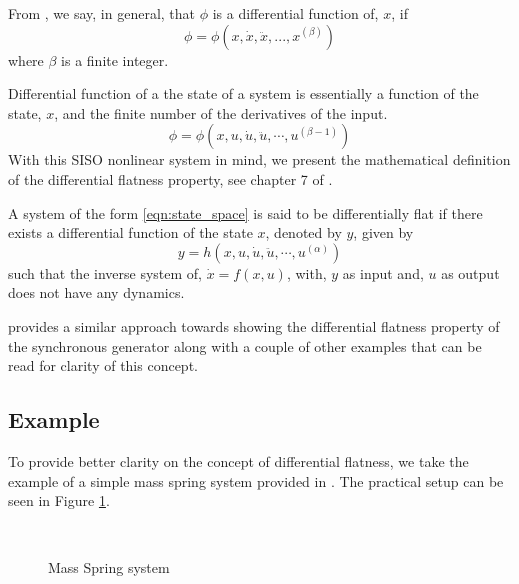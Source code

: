 \documentclass[letterpaper%
, twoside%
, 12pt%
,memoire%
, english%
,creativecommons,hyperref%
]{thETS}
\begin{document}
\begin{definition}
	From \citep{teschl2012ordinary}, we say, in general, that $\phi$ is a differential function of, $x$, if\\
	\begin{equation*}
		\phi=\phi(x,\dot{x},\ddot{x},...,x^{(\beta)})
	\end{equation*}
	where $\beta$ is a finite integer.
\end{definition}
Differential function of a the state of a system is essentially a function of the state, $x$, and the finite number of the derivatives of the input. 
\begin{equation*}
	\phi=\phi(x,u,\dot{u},\ddot{u},\cdots,u^{(\beta-1)})
\end{equation*}
With this SISO nonlinear system in mind, we present the mathematical definition of the differential flatness property, see chapter 7 of \citep{RN77}. 
\begin{definition} \label{def:diffFlat}
A system of the form \eqref{eqn:state_space} is said to be differentially flat if there exists a differential function of the state $x$, denoted by $y$, given by\\
	\begin{equation} \label{eqn:diffflat}
	y=h(x,u,\dot{u},\ddot{u},\cdots,u^{(\alpha)})
	\end{equation}
	such that the inverse system of, $\dot{x}=f(x,u)$, with, $y$ as input and, $u$ as output does not have any dynamics. 
\end{definition}
\citep{RN120} provides a similar approach towards showing the differential flatness property of the synchronous generator along with a couple of other examples that can be read for clarity of this concept. 
\subsection{Example}
To provide better clarity on the concept of differential flatness, we take the example of a simple mass spring system provided in \citep{levine2009differential}. The practical setup can be seen in Figure \ref{difflin}.
\begin{figure}
	\centering 
	 \\ \parbox{0.75\textwidth}{\caption{Mass Spring system \citep{levine2009differential}}\label{difflin}} 
\end{figure}
\end{document}

